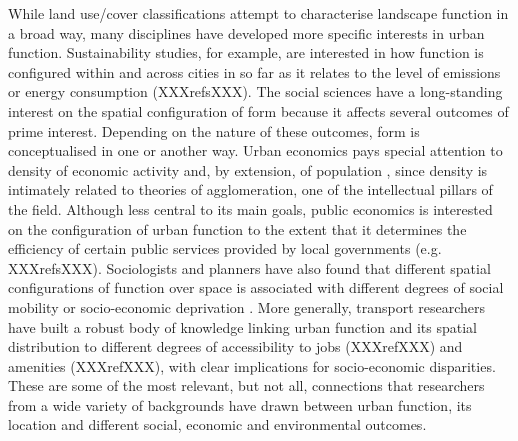 While land use/cover classifications attempt to characterise landscape
function in a broad way, many disciplines have developed more specific
interests in urban function.
Sustainability studies, for example, are interested in how function is
configured within and across cities in so far as it relates to the level of
emissions \citep{angel2018shape} or energy consumption (XXXrefsXXX).
The social sciences have a long-standing interest on the spatial
configuration of form because it affects several outcomes of prime interest.
Depending on the nature of these outcomes, form is conceptualised in one or
another way.
Urban economics pays special attention to density of economic activity and, by
extension, of population \citep{ahlfeldt2019, duranton2020economics}, since
density is intimately related to theories of agglomeration, one of the
intellectual pillars of the field.
Although less central to its main goals, public economics is interested on the
configuration of urban function to the extent that it determines the
efficiency of certain public services provided by local governments (e.g.
XXXrefsXXX).
Sociologists and planners have also found that different spatial configurations of function
over space is associated with different degrees of social mobility
\citep{ewing2016does} or socio-economic deprivation
\citep{venerandi2018scalable}.
More generally, transport researchers have built a robust body of knowledge
linking urban function and its spatial distribution to different degrees of
accessibility to jobs (XXXrefXXX) and amenities (XXXrefXXX), with clear
implications for socio-economic disparities.
These are some of the most relevant, but not all, connections that
researchers from a wide variety of backgrounds have drawn between urban
function, its location and different social, economic and environmental
outcomes.

